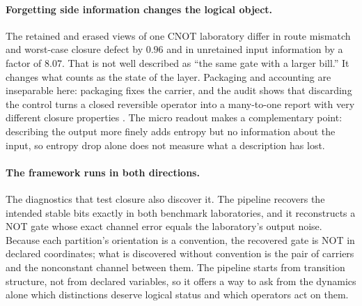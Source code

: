 \paragraph{Forgetting side information changes the logical object.}
The retained and erased views of one CNOT laboratory differ in route mismatch and worst-case closure defect by \(0.96\) and in unretained input information by a factor of \(8.07\). That is not well described as ``the same gate with a larger bill.'' It changes what counts as the state of the layer. Packaging and accounting are inseparable here: packaging fixes the carrier, and the audit shows that discarding the control turns a closed reversible operator into a many-to-one report with very different closure properties \cite{bennett1982thermodynamics,parrondo2015thermoinfo,esposito2012coarsegraining,kawaguchi2013hiddenepr}. The micro readout makes a complementary point: describing the output more finely adds entropy but no information about the input, so entropy drop alone does not measure what a description has lost.

\paragraph{The framework runs in both directions.}
The diagnostics that test closure also discover it. The pipeline recovers the intended stable bits exactly in both benchmark laboratories, and it reconstructs a NOT gate whose exact channel error equals the laboratory's output noise. Because each partition's orientation is a convention, the recovered gate is NOT in declared coordinates; what is discovered without convention is the pair of carriers and the nonconstant channel between them. The pipeline starts from transition structure, not from declared variables, so it offers a way to ask from the dynamics alone which distinctions deserve logical status and which operators act on them.

